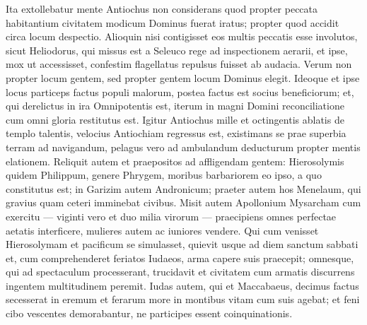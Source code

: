 \begin{biblechapter}
\verse Ita extollebatur mente Antiochus non considerans quod propter peccata habitantium civitatem modicum Dominus fuerat iratus; propter quod accidit circa locum despectio. 
\verse Alioquin nisi contigisset eos multis peccatis esse involutos, sicut Heliodorus, qui missus est a Seleuco rege ad inspectionem aerarii, et ipse, mox ut accessisset, confestim flagellatus repulsus fuisset ab audacia. 
\verse Verum non propter locum gentem, sed propter gentem locum Dominus elegit. 
\verse Ideoque et ipse locus particeps factus populi malorum, postea factus est socius beneficiorum; et, qui derelictus in ira Omnipotentis est, iterum in magni Domini reconciliatione cum omni gloria restitutus est. 
\verse Igitur Antiochus mille et octingentis ablatis de templo talentis, velocius Antiochiam regressus est, existimans se prae superbia terram ad navigandum, pelagus vero ad ambulandum deducturum propter mentis elationem. 
\verse Reliquit autem et praepositos ad affligendam gentem: Hierosolymis quidem Philippum, genere Phrygem, moribus barbariorem eo ipso, a quo constitutus est; 
\verse in Garizim autem Andronicum; praeter autem hos Menelaum, qui gravius quam ceteri imminebat civibus. 
\verse Misit autem Apollonium Mysarcham cum exercitu — viginti vero et duo milia virorum — praecipiens omnes perfectae aetatis interficere, mulieres autem ac iuniores vendere. 
\verse Qui cum venisset Hierosolymam et pacificum se simulasset, quievit usque ad diem sanctum sabbati et, cum comprehenderet feriatos Iudaeos, arma capere suis praecepit; 
\verse omnesque, qui ad spectaculum processerant, trucidavit et civitatem cum armatis discurrens ingentem multitudinem peremit. 
\verse Iudas autem, qui et Maccabaeus, decimus factus secesserat in eremum et ferarum more in montibus vitam cum suis agebat; et feni cibo vescentes demorabantur, ne participes essent coinquinationis. 
\end{biblechapter}

